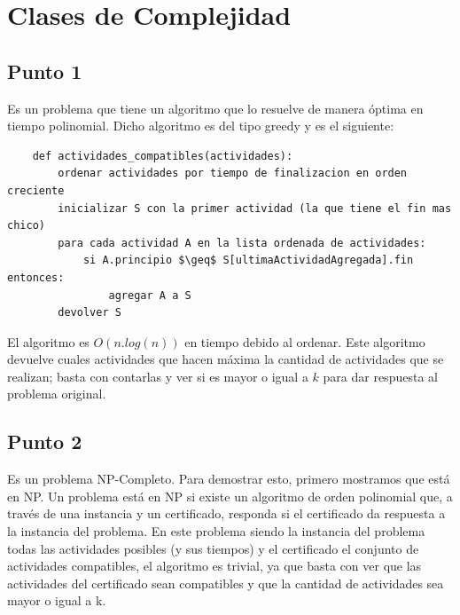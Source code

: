 \documentclass[a4paper,10pt]{article}
\begin{document}
\maketitle
\thispagestyle{empty}

\pagebreak 

\tableofcontents
\pagebreak

\clearpage
\section{Clases de Complejidad}

\subsection{Punto 1}
	Es un problema que tiene un algoritmo que lo resuelve de manera óptima en tiempo polinomial. Dicho algoritmo es del tipo greedy y es el siguiente:
	\begin{lstlisting}
	def actividades_compatibles(actividades):
	    ordenar actividades por tiempo de finalizacion en orden creciente
	    inicializar S con la primer actividad (la que tiene el fin mas chico)
	    para cada actividad A en la lista ordenada de actividades:
	        si A.principio $\geq$ S[ultimaActividadAgregada].fin entonces:
	            agregar A a S
	    devolver S
	\end{lstlisting}

	El algoritmo es $O(n.log(n))$ en tiempo debido al ordenar. Este algoritmo devuelve cuales actividades que hacen máxima la cantidad de actividades que se realizan; basta con contarlas y ver si es mayor o igual a $k$ para dar respuesta al problema original.

\subsection{Punto 2} \label{punto2}
	Es un problema NP-Completo. Para demostrar esto, primero mostramos que está en NP. Un problema está en NP si existe un algoritmo de orden polinomial que, a través de una instancia y un certificado, responda si el certificado da respuesta a la instancia del problema. En este problema siendo la instancia del problema todas las actividades posibles (y sus tiempos) y el certificado el conjunto de actividades compatibles, el algoritmo es trivial, ya que basta con ver que las actividades del certificado sean compatibles y que la cantidad de actividades sea mayor o igual a k.
\end{document}
